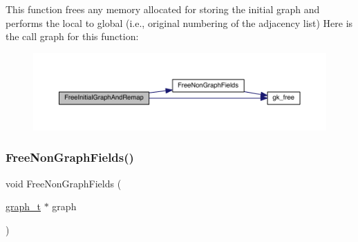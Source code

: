 This function frees any memory allocated for storing the initial graph and performs the local to global (i.\+e., original numbering of the adjacency list) Here is the call graph for this function\+:\nopagebreak
\begin{figure}[H]
\begin{center}
\leavevmode
\includegraphics[width=350pt]{a00951_a739360f530677f48f239c049cbbf7855_cgraph}
\end{center}
\end{figure}
\mbox{\label{a00951_a0ff13bda23f95ec19bb263ef036cd109}} 
\subsubsection{\texorpdfstring{Free\+Non\+Graph\+Fields()}{FreeNonGraphFields()}}
{\footnotesize\ttfamily void Free\+Non\+Graph\+Fields (\begin{DoxyParamCaption}\item[{\hyperlink{a00734}{graph\+\_\+t} $\ast$}]{graph }\end{DoxyParamCaption})}

